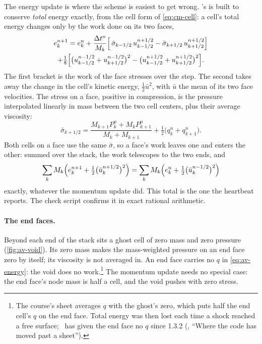The energy update is where the scheme is easiest to get wrong. \bw's is
built to conserve \emph{total} energy exactly, from the cell form of
\cref{eq:cm-cell}: a cell's total energy changes only by the work done on
its two faces,
\begin{multline}
e^{n+1}_k = e^n_k + \frac{\Delta t^n}{M_k}\Bigl[\,\bar\sigma_{k-1/2}\,
  u^{n+1/2}_{k-1/2} - \bar\sigma_{k+1/2}\,u^{n+1/2}_{k+1/2}\Bigr] \\
  + \tfrac{1}{8}\Bigl[\bigl(u^{n-1/2}_{k-1/2} + u^{n-1/2}_{k+1/2}\bigr)^2
  - \bigl(u^{n+1/2}_{k-1/2} + u^{n+1/2}_{k+1/2}\bigr)^2\Bigr].
\label{eq:av-energy}
\end{multline}
The first bracket is the work of the face stresses over the step. The
second takes away the change in the cell's kinetic energy,
$\tfrac{1}{2}\bar u^2$, with $\bar u$ the mean of its two face velocities.
The stress on a face, positive in compression, is the pressure interpolated
linearly in mass between the two cell centers, plus their average
viscosity:
\begin{equation}
\bar\sigma_{k+1/2} = \frac{M_{k+1}P^n_k + M_k P^n_{k+1}}{M_k + M_{k+1}}
  + \tfrac{1}{2}\bigl(q^n_k + q^n_{k+1}\bigr).
\label{eq:av-face-stress}
\end{equation}
Both cells on a face use the same $\bar\sigma$, so a face's work leaves
one and enters the other: summed over the stack, the work telescopes to
the two ends, and
\begin{equation}
\sum_k M_k\Bigl(e^{n+1}_k + \tfrac{1}{2}\bigl(\bar u^{n+1/2}_k\bigr)^2\Bigr)
= \sum_k M_k\Bigl(e^n_k + \tfrac{1}{2}\bigl(\bar u^{n-1/2}_k\bigr)^2\Bigr)
\label{eq:av-conserve}
\end{equation}
exactly, whatever the momentum update did. This total is the one the
heartbeat reports. The check script confirms it in exact rational
arithmetic.

\paragraph{The end faces.} Beyond each end of the stack sits a ghost cell
of zero mass and zero pressure (\cref{fig:av-void}). Its zero mass makes
the mass-weighted pressure on an end face zero by itself; its viscosity is
not averaged in. An end face carries no $q$ in \cref{eq:av-energy}: the
void does no work.\footnote{The course's sheet averages $q$ with the
ghost's zero, which puts half the end cell's $q$ on the end face. Total
energy was then lost each time a shock reached a free surface; \bw\ has
given the end face no $q$ since 1.3.2 (, ``Where the
code has moved past a sheet'').} The momentum update needs no special case:
the end face's node mass is half a cell, and the void pushes with zero
stress.

